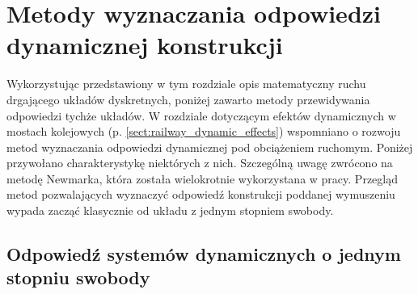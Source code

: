 \section{Metody wyznaczania odpowiedzi dynamicznej konstrukcji} \label{sect:dynamic_response_methods}
Wykorzystując przedstawiony w tym rozdziale opis matematyczny ruchu drgającego układów dyskretnych, poniżej zawarto metody przewidywania odpowiedzi tychże układów. W rozdziale dotyczącym efektów dynamicznych w mostach kolejowych (p. \ref{sect:railway_dynamic_effects}) wspomniano o rozwoju metod wyznaczania odpowiedzi dynamicznej pod obciążeniem ruchomym. Poniżej przywołano charakterystykę niektórych z nich. Szczególną uwagę zwrócono na metodę Newmarka, która została wielokrotnie wykorzystana w pracy. Przegląd metod pozwalających wyznaczyć odpowiedź konstrukcji poddanej wymuszeniu wypada zacząć klasycznie od układu z jednym stopniem swobody. 



\subsection{Odpowiedź systemów dynamicznych o jednym stopniu swobody} \label{section: sdof_response}

